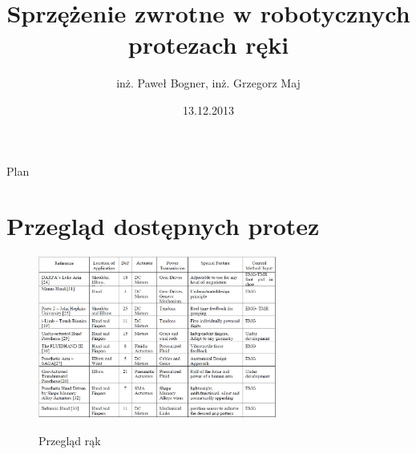 \documentclass[8pt]{beamer}
\title[Robotyczne protezy ręki, BeBionic]{Sprzężenie zwrotne w robotycznych protezach ręki}
\date[2013]{13.12.2013}
\author[inż. Paweł Bogner, inż. Grzegorz Maj]{inż. Paweł Bogner, inż. Grzegorz Maj}
\institute[PWr]{Politechnika Wrocławska}
\begin{document}
{
\frame{\maketitle}
}

\begin{frame}{Plan}
\begin{multicols}{2}
	\tableofcontents
	\end{multicols}
\end{frame}

\section{Przegląd dostępnych protez}

\begin{frame}%
	\begin{center}
		\begin{figure}
			\includegraphics[width=0.7\textwidth]{graphics/hands.jpg}
			\label{graph:hand}	
			\caption{Przegląd rąk \cite{bandara2012upper}}
		\end{figure}
	\end{center}

\end{frame}


 
\end{document}
